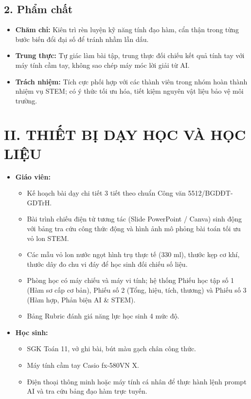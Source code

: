 \documentclass[12pt, a4paper]{article}
\begin{document}
\subsection*{2. Phẩm chất}

\begin{itemize}[leftmargin=1.2cm]
    \item \textbf{Chăm chỉ:} Kiên trì rèn luyện kỹ năng tính đạo hàm, cẩn thận trong từng bước biến đổi đại số để tránh nhầm lẫn dấu.
    \item \textbf{Trung thực:} Tự giác làm bài tập, trung thực đối chiếu kết quả tính tay với máy tính cầm tay, không sao chép máy móc lời giải từ AI.
    \item \textbf{Trách nhiệm:} Tích cực phối hợp với các thành viên trong nhóm hoàn thành nhiệm vụ STEM; có ý thức tối ưu hóa, tiết kiệm nguyên vật liệu bảo vệ môi trường.
\end{itemize}

\section*{II. THIẾT BỊ DẠY HỌC VÀ HỌC LIỆU}

\begin{itemize}[leftmargin=1.2cm]
    \item \textbf{Giáo viên:}
    \begin{itemize}[leftmargin=0.6cm]
        \item Kế hoạch bài dạy chi tiết 3 tiết theo chuẩn Công văn 5512/BGDĐT-GDTrH.
        \item Bài trình chiếu điện tử tương tác (Slide PowerPoint / Canva) sinh động với bảng tra cứu công thức động và hình ảnh mô phỏng bài toán tối ưu vỏ lon STEM.
        \item Các mẫu vỏ lon nước ngọt hình trụ thực tế ($330\text{ ml}$), thước kẹp cơ khí, thước dây đo chu vi đáy để học sinh đối chiếu số liệu.
        \item Phòng học có máy chiếu và máy vi tính; hệ thống Phiếu học tập số 1 (Hàm sơ cấp cơ bản), Phiếu số 2 (Tổng, hiệu, tích, thương) và Phiếu số 3 (Hàm hợp, Phản biện AI \& STEM).
        \item Bảng Rubric đánh giá năng lực học sinh 4 mức độ.
    \end{itemize}
    \item \textbf{Học sinh:}
    \begin{itemize}[leftmargin=0.6cm]
        \item SGK Toán 11, vở ghi bài, bút màu gạch chân công thức.
        \item Máy tính cầm tay Casio fx-580VN X.
        \item Điện thoại thông minh hoặc máy tính cá nhân để thực hành lệnh prompt AI và tra cứu bảng đạo hàm trực tuyến.
    \end{itemize}
\end{itemize}
\end{document}
